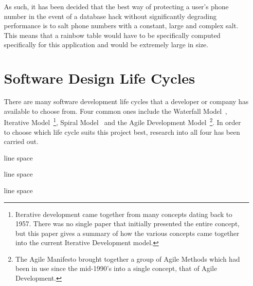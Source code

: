 \documentclass[authoryearcitations]{UoYCSproject}
\begin{document}
As such, it has been decided that the best way of protecting a user's phone number in the event of a database hack without significantly degrading performance is to salt phone numbers with a constant, large and complex salt. This means that a rainbow table would have to be specifically computed specifically for this application and would be extremely large in size.

\section{Software Design Life Cycles}
There are many software development life cycles that a developer or company has available to choose from.  Four common ones include the Waterfall Model~\cite{royce1970managing-FirstDescriptionOfWaterFallModelNotByName}, Iterative Model~\cite{briefHistoryOfIncrementalAndIterativeSoftwareDevelopment}\footnote{Iterative development came together from many concepts dating back to 1957.  There was no single paper that initially presented the entire concept, but this paper gives a summary of how the various concepts came together into the current Iterative Development model.}, Spiral Model~\cite{spiralModelSoftwareDevelopment} and the Agile Development Model~\cite{beck2001agile}\footnote{The Agile Manifesto brought together a group of Agile Methods which had been in use since the mid-1990's into a single concept, that of Agile Development.}. In order to choose which life cycle suits this project best, research into all four has been carried out.

line space

line space

line space


\end{document}
